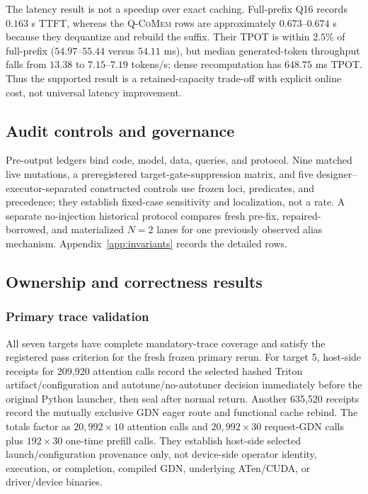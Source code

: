 \documentclass{article}
\newcommand{\qcomem}{\textsc{Q-CoMem}}
\begin{document}
The latency result is not a speedup over exact caching.  Full-prefix Q16 records
$0.163$ s TTFT, whereas the \qcomem{} rows are approximately $0.673$--$0.674$
s because they dequantize and rebuild the suffix.  Their TPOT is within $2.5\%$
of full-prefix ($54.97$--$55.44$ versus $54.11$ ms), but median generated-token
throughput falls from $13.38$ to $7.15$--$7.19$ tokens/s; dense recomputation
has $648.75$ ms TPOT.  Thus the supported result is a retained-capacity
trade-off with explicit online cost, not universal latency improvement.



\subsection{Audit controls and governance}

Pre-output ledgers bind code, model, data, queries, and protocol.  Nine matched
live mutations, a preregistered target-gate-suppression matrix, and five
designer--executor-separated constructed controls use frozen loci, predicates,
and precedence; they establish fixed-case sensitivity and localization, not a
rate.  A separate no-injection historical protocol compares fresh pre-fix,
repaired-borrowed, and materialized $N=2$ lanes for one previously observed
alias mechanism.  Appendix~\ref{app:invariants} records the detailed rows.

\subsection{Ownership and correctness results}
\label{sec:results}

\subsubsection{Primary trace validation}
\label{sec:target-status}

All seven targets have complete mandatory-trace coverage and satisfy the
registered pass criterion for the fresh frozen primary rerun.  For target 5,
host-side receipts for 209,920 attention calls record the selected hashed
Triton artifact/configuration and autotune/no-autotuner decision immediately
before the original Python launcher, then seal after normal return.  Another
635,520 receipts record the mutually exclusive GDN eager route and functional
cache rebind.  The totals factor as $20{,}992\times10$ attention calls and
$20{,}992\times30$ request-GDN calls plus $192\times30$ one-time prefill calls.
They establish host-side selected launch/configuration provenance only, not
device-side operator identity, execution, or completion, compiled GDN,
underlying ATen/CUDA, or driver/device binaries.
\end{document}

